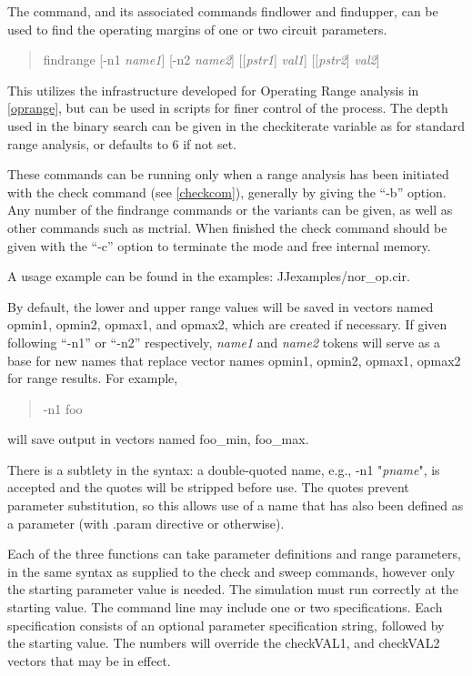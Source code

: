 
The command, and its associated commands {\cb findlower} and {\cb
findupper}, can be used to find the operating margins of one or two
circuit parameters.

\begin{quote}
{\vt findrange} [{\vt -n1} {\it name1\/}] [{\vt -n2} {\it name2\/}]
[[{\it pstr1\/}] {\it val1\/}] [[{\it pstr2\/}] {\it val2\/}]
\end{quote}

This utilizes the infrastructure developed for Operating Range
analysis in \ref{oprange}, but can be used in scripts for finer
control of the process.  The depth used in the binary search can be
given in the {\et checkiterate} variable as for standard range
analysis, or defaults to 6 if not set.

These commands can be running only when a range analysis has been
initiated with the {\cb check} command (see \ref{checkcom}), generally
by giving the ``{\vt -b}'' option.  Any number of the {\cb findrange}
commands or the variants can be given, as well as other commands such
as {\cb mctrial}.  When finished the {\cb check} command should be
given with the ``{\vt -c}'' option to terminate the mode and free
internal memory.

A usage example can be found in the examples: {\vt JJexamples/nor\_op.cir}.

By default, the lower and upper range values will be saved in vectors
named {\vt opmin1}, {\vt opmin2}, {\vt opmax1}, and {\vt opmax2},
which are created if necessary.  If given following ``{\vt -n1}'' or
``{\vt -n2}'' respectively, {\it name1} and {\it name2} tokens will
serve as a base for new names that replace vector names {\vt opmin1},
{\vt opmin2}, {\vt opmax1}, {\vt opmax2} for range results.  For
example,
\begin{quote}
\vt -n1 foo
\end{quote}
will save output in vectors named {\vt foo\_min}, {\vt foo\_max}.

There is a subtlety in the syntax:  a double-quoted name, e.g.,
{\vt -n1 "}{\it pname\/}{\vt "}, is accepted and the quotes will
be stripped before use.  The quotes prevent parameter substitution, so
this allows use of a name that has also been defined as a parameter
(with {\vt .param} directive or otherwise).

Each of the three functions can take parameter definitions and range
parameters, in the same syntax as supplied to the {\cb check} and {\cb
sweep} commands, however only the starting parameter value is needed. 
The simulation must run correctly at the starting value.  The command
line may include one or two specifications.  Each specification
consists of an optional parameter specification string, followed by
the starting value.  The numbers will override the {\vt checkVAL1},
and {\vt checkVAL2} vectors that may be in effect.


